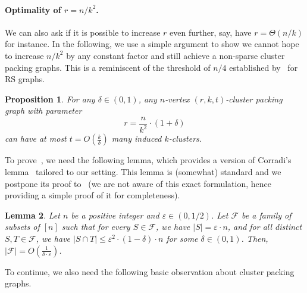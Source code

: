 \documentclass[11pt]{article}
\newtheorem{lemma}{Lemma}[section]
\newtheorem{proposition}[lemma]{Proposition}
\theoremstyle{definition}
\renewcommand{\leq}{\leqslant}
\newcommand{\card}[1]{\left\vert{#1}\right\vert}
\begin{document}

\paragraph{Optimality of $r=n/k^2$.} We can also ask if it is possible to increase $r$ even further, say, have $r = \Theta(n/k)$ for instance. In the following, we use a simple argument 
to show we cannot hope to increase $n/k^2$ by any constant factor and still achieve a non-sparse cluster packing graphs. This is a reminiscent of the threshold of $n/4$ established by~\cite{FoxHS17} for RS graphs. 

\begin{proposition}\label{lem:tight-structure}
	For any $\delta \in (0,1)$, any $n$-vertex $(r, k, t)$-cluster packing graph with parameter 
	\[
	r = \frac{n}{k^2} \cdot (1+\delta)
	\]
	 can have at most $t=O(\frac{k}{\delta})$ many induced $k$-clusters.
\end{proposition}

To prove~, we need the following lemma, which provides a version of Corradi's lemma~\cite[Lemma 2.1]{Jukna:2001} tailored to our setting. 
This lemma is (somewhat) standard and we postpone its proof to~ (we are not aware of this exact formulation, hence providing a simple proof of it for completeness). 

\begin{lemma}\label{lem:set-limited-size}
Let $n$ be a positive integer and $\varepsilon \in (0, 1/2)$. Let $\mathcal{F}$ be a family of subsets of $[n]$ such that for every $S \in \mathcal{F}$, we have $\card{S} = \varepsilon \cdot n$, and for all distinct $S, T \in \mathcal{F}$, we have 
$\left|S \cap T \right| \leq \varepsilon^2 \cdot (1-\delta)\cdot n$ for some $\delta\in (0, 1)$.
Then, $\left|\mathcal{F}\right| = O(\frac{1}{\delta\cdot \varepsilon})$.
\end{lemma}

To continue, we also need the following basic observation about cluster packing graphs. 
\end{document}

